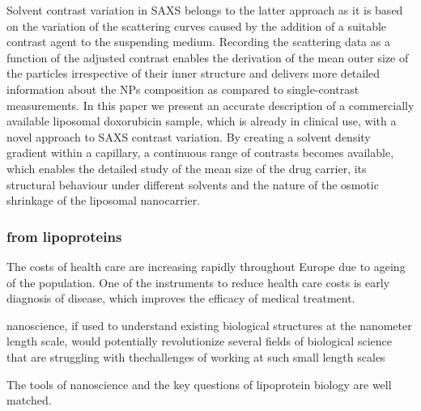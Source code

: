 Solvent contrast variation in SAXS belongs to the latter approach as it is based on the variation of the scattering curves caused by the addition of a suitable contrast agent to the suspending medium. Recording the scattering data as a function of the adjusted contrast enables the derivation of the mean outer size of the particles irrespective of their inner structure and delivers more detailed information about the NPs composition as compared to single-contrast measurements. In this paper we present an accurate description of a commercially available liposomal doxorubicin sample, which is already in clinical use, with a novel approach to SAXS contrast variation. By creating a solvent density gradient within a capillary, a continuous range of contrasts becomes available, which enables the detailed study of the mean size of the drug carrier, its structural behaviour under different solvents and the nature of the osmotic shrinkage of the liposomal nanocarrier.


\subsubsection{from lipoproteins}

The costs of health care are increasing rapidly throughout Europe due to ageing of the population. One of the instruments to reduce health care costs is early diagnosis of disease, which improves the efficacy of medical treatment.

nanoscience, if used to understand existing biological structures at the nanometer length scale, would potentially revolutionize several fields of biological science that are struggling with thechallenges of working at such small length scales

The tools of nanoscience and the key questions of lipoprotein biology are well matched. 

